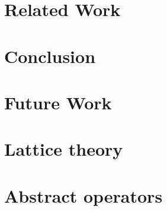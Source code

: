 \documentclass[twoside,11pt,openright]{report}
\theoremstyle{definition}
\begin{document}
\chapter{Related Work}
\label{ch:relatedWork}


\chapter{Conclusion}
\label{ch:conclusion}



\chapter{Future Work}
\label{ch:futureWork}






\newpage
\appendix
\chapter{Lattice theory}
\label{app:lattice}


%

%

\chapter{Abstract operators}
\label{app:abstract_operators}


\end{document}
